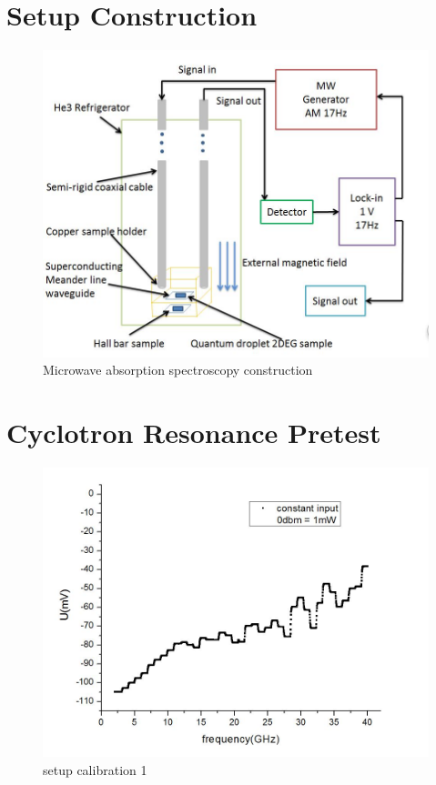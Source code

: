 \documentclass[12pt]{ruthesis}
\begin{document}
\section{Setup Construction}\label{Construction}

\begin{figure}
  \centering
  \includegraphics[scale=0.5]{figures/configuration.JPG}
  \caption{Microwave absorption spectroscopy construction}
  \label{configuration}
\end{figure}
 
 
 
 
 
 
 

\section{Cyclotron Resonance Pretest}\label{Cyclotron}

\begin{figure}
  \centering
  \includegraphics[totalheight=8cm]{figures/spec.JPG}
  \caption{setup calibration 1}
  \label{spec}
\end{figure}
 
\end{document}
